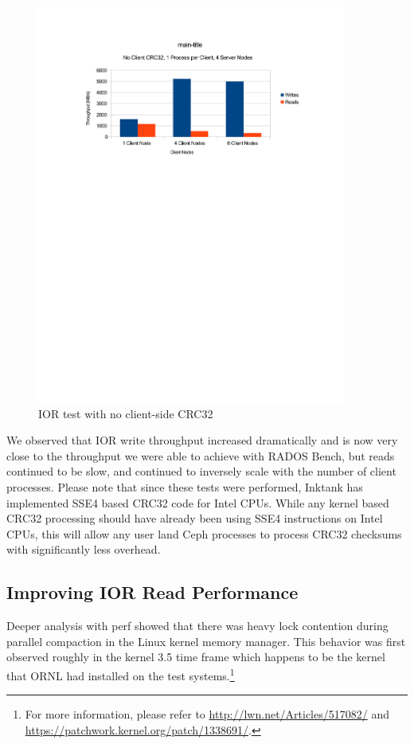 \documentclass{article}
\begin{document}
\begin{figure}[htb]
\centering
\includegraphics[width=4in]{ior-client-no-crc32}
\caption{IOR test with no client-side CRC32}
\label{fig:ior-no-client-crc32}
\end{figure}

We observed that IOR write throughput increased dramatically and is now very
close to the throughput we were able to achieve with RADOS Bench, but reads
continued to be slow, and continued to inversely scale with the number of client
processes.  Please note that since these tests were performed, Inktank has
implemented SSE4 based CRC32 code for Intel CPUs.  While any kernel based CRC32
processing should have already been using SSE4 instructions on Intel CPUs, this
will allow any user land Ceph processes to process CRC32 checksums with
significantly less overhead.

\subsection{Improving IOR Read Performance}

Deeper analysis with perf showed that there was heavy lock contention during
parallel compaction in the Linux kernel memory manager.  This behavior was first
observed roughly in the kernel 3.5 time frame which happens to be the kernel
that ORNL had installed on the test systems.\footnote{For more information,
please refer to \url{http://lwn.net/Articles/517082/} and
\url{https://patchwork.kernel.org/patch/1338691/}.}
\end{document}
